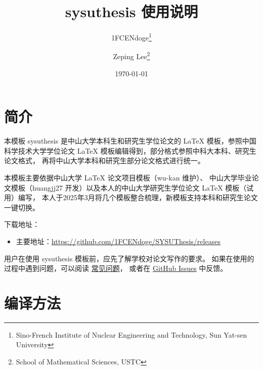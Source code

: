 \documentclass[a4paper]{ltxdoc}
\DeclareRobustCommand\pkg{\textsf}
\DeclareRobustCommand\cls{\textsf}
\begin{document}
\title{\cls{sysuthesis} 使用说明}
\author{1FCENdoge\thanks{Sino-French Institute of Nuclear Engineering and Technology, Sun Yat-sen University}\and
        Zeping Lee\thanks{School of Mathematical Sciences, USTC} }
\date{\today}
\maketitle



\section{简介}

本模板 \cls{sysuthesis} 是中山大学本科生和研究生学位论文的 \LaTeX{}
模板，参照中国科学技术大学学位论文 \LaTeX{}
模板编辑得到，部分格式参照中科大本科、研究生论文格式，
再将中山大学本科和研究生部分论文格式进行统一。

本模板主要依据中山大学 LaTeX 论文项目模板（wu-kan 维护）、
中山大学毕业论文模板（huangjj27 开发）以及本人的中山大学研究生学位论文 LaTeX 模板（试用）编写，
本人于2025年3月将几个模板整合梳理，新模板支持本科和研究生论文一键切换。

下载地址：
\begin{itemize}
  \item 主要地址：\url{https://github.com/1FCENdoge/SYSUThesis/releases}
\end{itemize}

用户在使用 \pkg{sysuthesis} 模板前，应先了解学校对论文写作的要求。
如果在使用的过程中遇到问题，可以阅读
\href{https://github.com/ustctug/sysuthesis/wiki}{常见问题}，
或者在 \href{https://github.com/1FCENdoge/SYSUThesis/issues}{GitHub Issues}
中反馈。



\section{编译方法}
\end{document}
